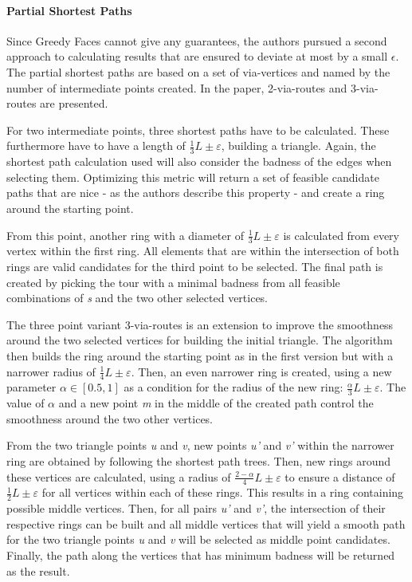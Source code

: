 \paragraph{Partial Shortest Paths}

Since Greedy Faces cannot give any guarantees, the authors pursued a second approach to calculating results that are ensured to deviate at most by a small $\epsilon$.
The partial shortest paths are based on a set of via-vertices and named by the number of intermediate points created. 
In the paper, 2-via-routes and 3-via-routes are presented.

For two intermediate points, three shortest paths have to be calculated.
These furthermore have to have a length of $\frac{1}{3} L \pm \varepsilon$, building a triangle.
Again, the shortest path calculation used will also consider the badness of the edges when selecting them.
Optimizing this metric will return a set of feasible candidate paths that are \glqq nice\grqq{} - as the authors describe this property - and create a ring around the starting point.

From this point, another ring with a diameter of $\frac{1}{3} L \pm \varepsilon$ is calculated from every vertex within the first ring.
All elements that are within the intersection of both rings are valid candidates for the third point to be selected. 
The final path is created by picking the tour with a minimal badness from all feasible combinations of \textit{s} and the two other selected vertices. \cite{gemsa_efficient_2013}

The three point variant 3-via-routes is an extension to improve the smoothness around the two selected vertices for building the initial triangle. 
The algorithm then builds the ring around the starting point as in the first version but with a narrower radius of $\frac{1}{4} L \pm \varepsilon$.
Then, an even narrower ring is created, using a new parameter $\alpha \in [0.5,1]$ as a condition for the radius of the new ring: $\frac{\alpha}{3} L \pm \varepsilon$.
The value of $\alpha$ and a new point \textit{m} in the middle of the created path control the smoothness around the two other vertices.

From the two triangle points \textit{u} and \textit{v}, new points \textit{u'} and \textit{v'} within the narrower ring are obtained by following the shortest path trees. 
Then, new rings around these vertices are calculated, using a radius of  $\frac{2-\alpha}{4} L \pm \varepsilon$ to ensure a distance of  $\frac{1}{2} L \pm \varepsilon$ for all vertices within each of these rings.
This results in a ring containing possible middle vertices.
Then, for all pairs \textit{u'} and \textit{v'}, the intersection of their respective rings can be built and all middle vertices that will yield a smooth path for the two triangle points \textit{u} and \textit{v} will be selected as middle point candidates.
Finally, the path along the vertices that has minimum badness will be returned as the result. \cite{gemsa_efficient_2013}


